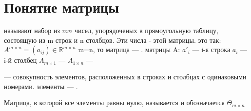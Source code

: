 \chapter{Понятие матрицы}
\begin{opred}
 называют набор из $mn$ чисел, упорядоченых в прямоугольную таблицу, состоящую из m строк и n столбцов.
Эти числа -  этой матрицы.
 это так: $A^{m\times{}n}=\left( a_{ij} \right) \in \mathbb {R}^{m\times{}n}$
 m=n, то матрица --- .
 матрицы A:
\newline$a'_i$ --- i-я строка
\newline$a_i$ --- i-й столбец
\newline$A_{m\times{}1}$ --- 
\newline$A_{1\times{}n}$ --- 
\end{opred}
\begin{opred}
 --- совокупность элементов, расположенных в строках и столбцах с одинаковыми номерами.
 элементы --- .
\end{opred}
\begin{opred}
Матрица, в которой все элементы равны нулю, называется  и обозначается $\Theta_{m\times{}n}$
\end{opred}
